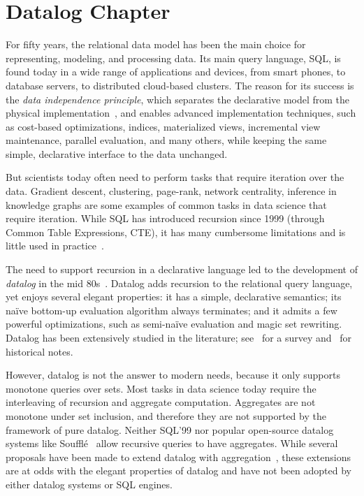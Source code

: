 \chapter{Datalog Chapter}
\label{chap:datalogo}

For fifty years, the relational data model has been the main choice for
representing, modeling, and processing data.  Its main query
language, SQL, is found today in a wide range of applications and
devices, from smart phones, to database servers, to distributed
cloud-based clusters.  The reason for its success is the {\em data
  independence principle}, which separates the declarative model from
the physical implementation~\cite{DBLP:journals/cacm/Codd70}, and
enables advanced implementation techniques, such as cost-based
optimizations, indices, materialized views, incremental view
maintenance, parallel evaluation, and many others, while keeping the
same simple, declarative interface to the data unchanged.

But scientists today often need to perform tasks that require
iteration over the data.
Gradient descent, clustering, page-rank, network centrality, inference
in knowledge graphs are some examples of common tasks in data science
that require iteration.  While SQL has introduced recursion since 1999
(through Common Table Expressions, CTE), it has many cumbersome
limitations and is little used in practice~\cite{frankmcsherry-2022}.

The need to support recursion in a declarative language led to the
development of {\em datalog} in the mid 80s~\cite{DBLP:conf/pods/Vianu21}.
Datalog adds recursion to the relational query language, yet enjoys several elegant
properties: it has a simple, declarative semantics; its na\"ive
bottom-up evaluation algorithm always terminates; and it admits a few
powerful optimizations, such as semi-na\"ive evaluation and magic set
rewriting.  Datalog has been extensively studied in the literature;
see~\cite{DBLP:journals/ftdb/GreenHLZ13} for a survey
and~\cite{DBLP:books/mc/18/MaierTKW18,DBLP:conf/pods/Vianu21} for historical notes.

However, datalog is not the answer to modern needs, because it only
supports monotone queries over sets.  Most tasks in data science today
require the interleaving of recursion and aggregate computation.
Aggregates are not monotone under set inclusion, and therefore they
are not supported by the framework of pure datalog.  Neither SQL'99
nor popular open-source datalog systems like
Souffl\'e~\cite{DBLP:conf/cav/JordanSS16} allow recursive queries to
have aggregates.  While several proposals have been made to extend
datalog with
aggregation~\cite{DBLP:conf/pods/GangulyGZ91,DBLP:conf/pods/RossS92,DBLP:journals/jcss/GangulyGZ95,DBLP:journals/vldb/MazuranSZ13,DBLP:conf/icde/ShkapskyYZ15,DBLP:conf/sigmod/ShkapskyYICCZ16,DBLP:conf/amw/ZanioloYDI16,DBLP:journals/tplp/ZanioloYDSCI17,DBLP:conf/amw/ZanioloYIDSC18,DBLP:journals/tplp/CondieDISYZ18,DBLP:conf/sigmod/0001WMSYDZ19,DBLP:journals/corr/abs-1910-08888,DBLP:journals/corr/abs-1909-08249,DBLP:journals/debu/ZanioloD0LL021},
these extensions are at odds with the elegant properties of datalog
and have not been adopted by either datalog systems or SQL engines.


